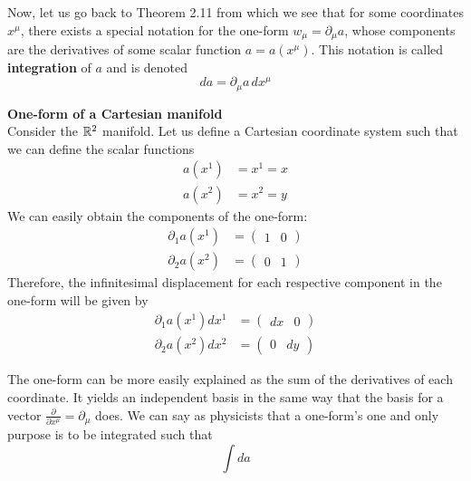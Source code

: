 \documentclass{article}
\begin{document}
 			Now, let us go back to Theorem 2.11 from which we see that for some coordinates $x^\mu$, there exists a special notation for the one-form $w_\mu = \partial_\mu a$, whose components are the derivatives of some scalar function $a=a(x^\mu)$. This notation is called \textbf{integration} of $a$ and is denoted
 			\begin{equation}
 				\label{eq:TheDifferential}
 				\boxed{da = \partial_\mu a \,dx^\mu}
 			\end{equation}
 			\begin{exmp}
 				\textbf{One-form of a Cartesian manifold} \\
 				Consider the $\mathbb{R}^2$ manifold. Let us define a Cartesian coordinate system such that we can define the scalar functions
 				\begin{align*}
 					a(x^1) &= x^1 = x \\
 					a(x^2) &= x^2 = y
 				\end{align*}
 				We can easily obtain the components of the one-form:
 				\begin{align*}
 					\partial_1 a(x^1) &= \begin{pmatrix} 1 & 0 \end{pmatrix} \\
 					\partial_2 a(x^2) &= \begin{pmatrix} 0 & 1 \end{pmatrix}
 				\end{align*} 
 				Therefore, the infinitesimal displacement for each respective component in the one-form will be given by
 				\begin{align*}
 					\partial_1 a(x^1) dx^1 &= \begin{pmatrix} dx & 0 \end{pmatrix} \\
 					\partial_2 a(x^2) dx^2 &= \begin{pmatrix} 0 & dy \end{pmatrix}
 				\end{align*}
 			\end{exmp} \noindent
 			The one-form can be more easily explained as the sum of the derivatives of each coordinate. It yields an independent basis in the same way that the basis for a vector $\frac{\partial}{\partial x^\mu} = \partial_\mu$ does. We can say as physicists that a one-form's one and only purpose is to be integrated such that
 			$$ \int da $$
 		
\end{document}
